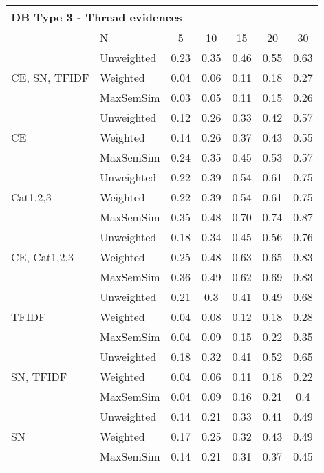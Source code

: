 \documentclass[conference]{IEEEtran}
\begin{document}
\begin{table*}[!h]
\begin{tabular}{l||l|ccccc}
		\multicolumn{7}{l}{DB Type 3 - Thread evidences}\\\hline\hline
		& N & 5 & 10 & 15 & 20 & 30\\\hline
		\hline
		
		\multirow{3}{*}{CE, SN, TFIDF} & Unweighted & 0.23 & 0.35 & 0.46 & 0.55 & 0.63\\
		 & Weighted & 0.04 & 0.06 & 0.11 & 0.18 & 0.27\\
		 & MaxSemSim & 0.03 & 0.05 & 0.11 & 0.15 & 0.26\\ 
		\hline
		
		\multirow{3}{*}{CE} & Unweighted & 0.12 & 0.26 & 0.33 & 0.42 & 0.57\\
		 & Weighted & 0.14 & 0.26 & 0.37 & 0.43 & 0.55\\
		 & MaxSemSim & 0.24 & 0.35 & 0.45 & 0.53 & 0.57\\ 
		\hline
		
		\multirow{3}{*}{Cat1,2,3} & Unweighted & 0.22 & 0.39 & 0.54 & 0.61 & 0.75\\
		 & Weighted & 0.22 & 0.39 & 0.54 & 0.61 & 0.75\\
		 & MaxSemSim & 0.35 & 0.48 & 0.70 & 0.74 & 0.87\\ 
		\hline
		
		\multirow{3}{*}{CE, Cat1,2,3} & Unweighted & 0.18 & 0.34 & 0.45 & 0.56 & 0.76\\
		 & Weighted & 0.25 & 0.48 & 0.63 & 0.65 & 0.83\\
		 & MaxSemSim & 0.36 & 0.49 & 0.62 & 0.69 & 0.83\\ 
		\hline
		
		\multirow{3}{*}{TFIDF} & Unweighted & 0.21 & 0.3 & 0.41 & 0.49 & 0.68\\
		 & Weighted & 0.04 & 0.08 & 0.12 & 0.18 & 0.28\\
		 & MaxSemSim & 0.04 & 0.09 & 0.15 & 0.22 & 0.35\\ 
		\hline
		
		\multirow{3}{*}{SN, TFIDF} & Unweighted & 0.18 & 0.32 & 0.41 & 0.52 & 0.65\\
		 & Weighted & 0.04 & 0.06 & 0.11 & 0.18 & 0.22\\
		 & MaxSemSim & 0.04 & 0.09 & 0.16 & 0.21 & 0.4 \\ 
		\hline
		
		\multirow{3}{*}{SN} & Unweighted & 0.14 & 0.21 & 0.33 & 0.41 & 0.49\\
		 & Weighted & 0.17 & 0.25 & 0.32 & 0.43 & 0.49\\
		 & MaxSemSim & 0.14 & 0.21 & 0.31 & 0.37 & 0.45\\ 
		\hline				
	\end{tabular}
\end{table*}
	
\end{document}
